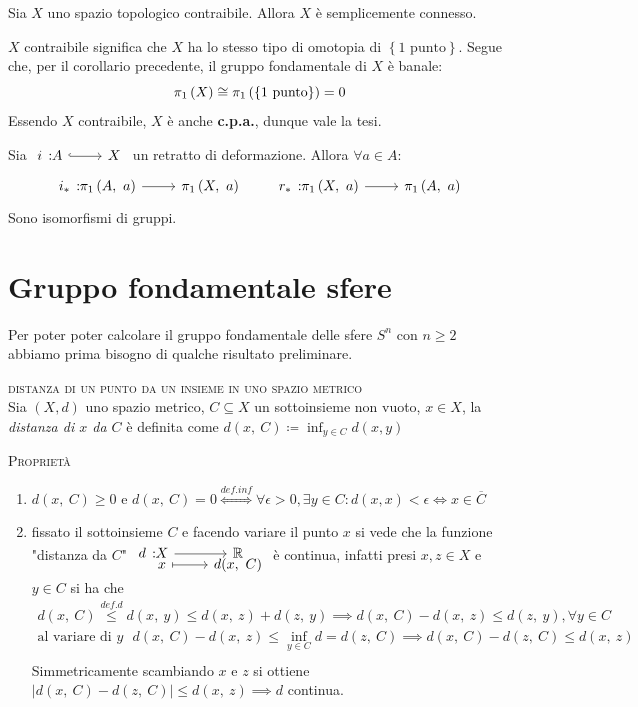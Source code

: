 \begin{corollary}
	Sia $X$ uno spazio topologico contraibile. Allora $X$ è semplicemente connesso.
\end{corollary}
\begin{demonstration}
	$X$ contraibile significa che $X$ ha lo stesso tipo di omotopia di $\left\{1\text{ punto}\right\}$. Segue che, per il corollario precedente, il gruppo fondamentale di $X$ è banale:
	\begin{equation*}
		\gruf{X}{\ }\cong\gruf{\left\{1\text{ punto}\right\}}{\ }=0
	\end{equation*}
	Essendo $X$ contraibile, $X$ è anche \textbf{c.p.a.}, dunque vale la tesi.
\end{demonstration}
\begin{corollary} \label{inclusione rdd isomorfismo}
	Sia $\incl{i}{A}{X}$ un retratto di deformazione. Allora $\forall a\in A$:
	\begin{equation}
		\funz{i_{\ast}}{\gruf{A}{a}}{\gruf{X}{a}}\qquad\funz{r_{\ast}}{\gruf{X}{a}}{\gruf{A}{a}}
	\end{equation}
Sono isomorfismi di gruppi.
\vspace{-6mm}
\end{corollary}

		\section{Gruppo fondamentale sfere}
Per poter poter calcolare il gruppo fondamentale delle sfere $S^n$ con $n\geq 2$ abbiamo prima bisogno di qualche risultato preliminare.
\begin{define} \textsc{distanza di un punto da un insieme in uno spazio metrico} \\
	Sia $\left(X, d\right)$ uno spazio metrico, $C\subseteq X$ un sottoinsieme non vuoto, $x\in X$, la \textit{distanza di $x$ da $C$} è definita come $d(x,\ C)\coloneqq \inf_{y\in C} d(x,y)$
\end{define}
\textsc{Proprietà} \\
\begin{enumerate}
	\item $d(x,\ C)\geq 0$ e $d(x,\ C)=0 \stackrel{def. inf}{\iff} \forall\epsilon >0, \exists y\in C \colon d(x,x)<\epsilon \iff x\in\overline{C}$
	\item fissato il sottoinsieme $C$ e facendo variare il punto $x$ si vede che la funzione "distanza da $C$" $\funztot d X \realset x {d(x,\ C)}$ è continua, infatti presi $x,z\in X$ e $y\in C$ si ha che
	\begin{gather*}
		d(x,\ C)\stackrel{def. d}{\leq} d(x,\ y) \leq d(x,\ z) + d(z,\ y) \implies d(x,\ C) - d(x,\ z) \leq d(z,\ y), \forall y\in C\\
		\text{al variare di $y$ } d(x,\ C) - d(x,\ z) \leq \inf_{y\in C} d = d(z,\ C) \implies d(x,\ C) - d(z,\ C) \leq d(x,\ z) \\
	\end{gather*}
	Simmetricamente scambiando $x$ e $z$ si ottiene  $\lvert d(x,\ C) - d(z,\ C) \rvert \leq d(x,\ z) \implies d$ continua.
\end{enumerate}

